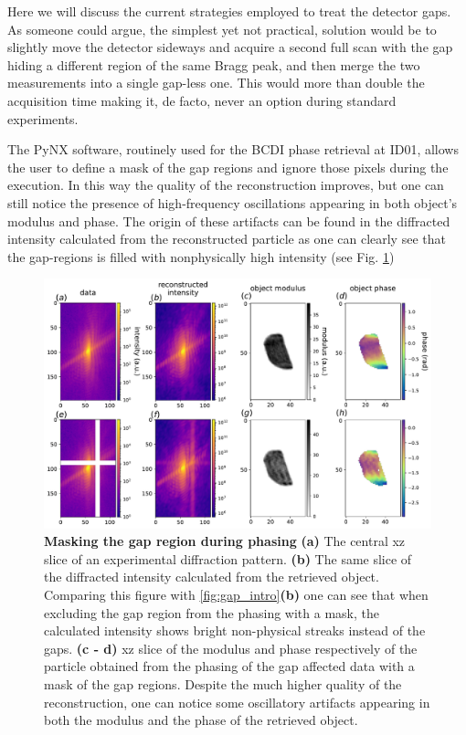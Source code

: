 Here we will discuss the current strategies employed to treat the detector gaps. As someone could argue, the simplest
yet not practical, solution would be to slightly move the detector sideways and acquire a second full scan with the
gap hiding a different region of the same Bragg peak, and then merge the two measurements into a single gap-less one. 
This would more than double the acquisition time making it, de facto, never an option during standard experiments. 

The PyNX software, routinely used for the BCDI phase retrieval at ID01, allows the user to define a mask of the gap 
regions and ignore those pixels during the execution. In this way the quality of the reconstruction improves, 
but one can still notice the presence of high-frequency oscillations appearing in both object's modulus and phase.
The origin of these artifacts can be found in the diffracted intensity calculated from the reconstructed particle as 
one can clearly see that the gap-regions is filled with nonphysically high intensity (see Fig. \ref{fig:gap_intro_mask})

\begin{figure}[h]
    \includegraphics[width=\textwidth]{figures/Inpainting/gaps_mask.pdf}
    \caption{\textbf{Masking the gap region during phasing} 
    \textbf{(a)} The central xz slice of an experimental diffraction pattern. \textbf{(b)} The same slice of the diffracted
    intensity calculated from the retrieved object. Comparing this figure with \ref{fig:gap_intro}\textbf{(b)} one can see that
    when excluding the gap region from the phasing with a mask, the calculated intensity shows bright non-physical streaks 
    instead of the gaps. \textbf{(c - d)} xz slice of the modulus and phase respectively of the particle obtained from the 
    phasing of the gap affected data with a mask of the gap regions. Despite the much higher quality of the reconstruction, 
    one can notice some oscillatory artifacts appearing in both the modulus and the phase of the retrieved object. }
    \label{fig:gap_intro_mask}
    \end{figure}

